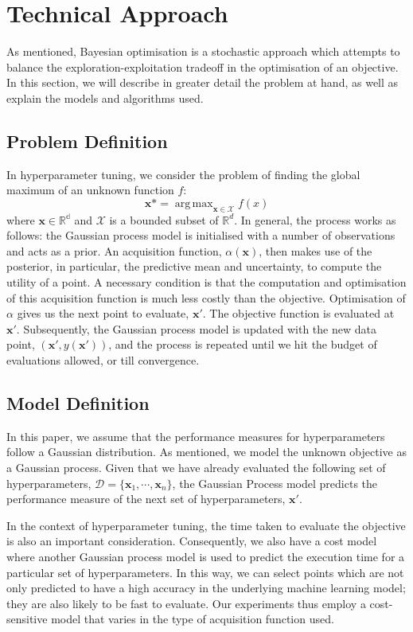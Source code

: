 \documentclass[letterpaper]{article}
\DeclareMathOperator*{\argmax}{arg\,max}
\begin{document}
\section{Technical Approach}
As mentioned, Bayesian optimisation is a stochastic approach which attempts to
balance the exploration-exploitation tradeoff in the optimisation of an objective.
In this section, we will describe in greater detail the problem at hand, as well
as explain the models and algorithms used.

\subsection{Problem Definition}
In hyperparameter tuning, we consider the problem of finding the global maximum of
an unknown function $f$:
$$\textbf{x*}=\argmax_{\textbf{x}\in\mathcal{X}}{f(x)}$$
where $\textbf{x} \in \mathbb{R^d}$ and $\mathcal{X}$ is a bounded subset of
$\mathbb{R}^d$. In general, the process works as follows: the Gaussian process model
is initialised with a number of observations and acts as a prior.
An acquisition function, $\alpha(\textbf{x})$, then makes use
of the posterior, in particular, the predictive mean and uncertainty,
to compute the utility of a point. A necessary condition is that the computation and
optimisation of this acquisition function is much less costly than the objective.
Optimisation of $\alpha$ gives us the next point to evaluate, $\textbf{x}'$. The
objective function is evaluated at $\textbf{x}'$. Subsequently, the Gaussian process
model is updated with the new data point, $(\textbf{x}', y(\textbf{x}'))$, and the
process is repeated until we hit the budget of evaluations allowed, or till
convergence.

\subsection{Model Definition}
In this paper, we assume that the performance measures for hyperparameters follow a
Gaussian distribution. As mentioned, we model the unknown objective as a Gaussian process.
Given that we have already evaluated the following set of hyperparameters,
$\mathcal{D}=\{\textbf{x}_1, \cdots, \textbf{x}_n\}$, the Gaussian
Process model predicts the performance measure of the next set of hyperparameters,
$\textbf{x}'$.

In the context of hyperparameter tuning, the time taken to evaluate the objective is
also an important consideration. Consequently, we also have a cost model where
another Gaussian process model is used to predict the execution time for a particular
set of hyperparameters. In this way, we can select points which are not only
predicted to have a high accuracy in the underlying machine learning model; they
are also likely to be fast to evaluate. Our experiments thus employ
a cost-sensitive model that varies in the type of acquisition function used.
\end{document}
